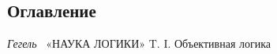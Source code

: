 \clearpage\subsection{Оглавление}

\bigskip

{\centering
\textit{Гегель} \ «НАУКА ЛОГИКИ» T. I. Объективная логика
\par}

\setcounter{tocdepth}{7}
\renewcommand\contentsname{}
\tableofcontents

\bigskip


\bigskip

\clearpage\setcounter{page}{1}
\bigskip

